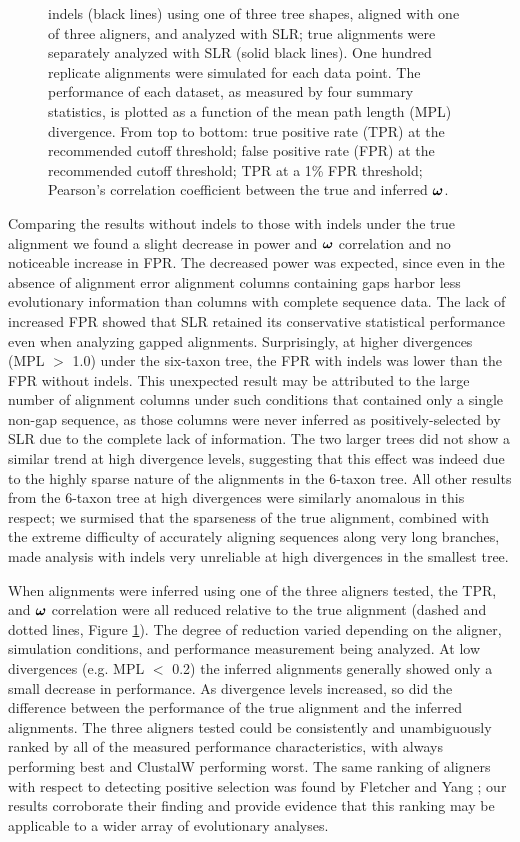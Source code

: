 \documentclass{article}
\begin{document}
\begin{figure}[t]
{  indels (black lines) using one of three tree shapes, aligned with
  one of three aligners, and analyzed with SLR; true alignments were
  separately analyzed with SLR (solid black lines). One hundred
  replicate alignments were simulated for each data point. The
  performance of each dataset, as measured by four summary statistics,
  is plotted as a function of the mean path length (MPL)
  divergence. From top to bottom: true positive rate (TPR) at the
  recommended cutoff threshold; false positive rate (FPR) at the
  recommended cutoff threshold; TPR at a 1\% FPR threshold; Pearson's
  correlation coefficient between the true and inferred $\bm{\omega}$.}
\label{fig_3}
\end{figure}

Comparing the results without indels to those with indels under the
true alignment we found a slight decrease in power and $\bm{\omega}$
correlation and no noticeable increase in FPR. The decreased power was
expected, since even in the absence of alignment error alignment
columns containing gaps harbor less evolutionary information than
columns with complete sequence data. The lack of increased FPR showed
that SLR retained its conservative statistical performance even when
analyzing gapped alignments. Surprisingly, at higher divergences (MPL
$>$ 1.0) under the six-taxon tree, the FPR with indels was lower than
the FPR without indels. This unexpected result may be attributed to
the large number of alignment columns under such conditions that
contained only a single non-gap sequence, as those columns were never
inferred as positively-selected by SLR due to the complete lack of
information. The two larger trees did not show a similar trend at high
divergence levels, suggesting that this effect was indeed due to the
highly sparse nature of the alignments in the 6-taxon tree. All other
results from the 6-taxon tree at high divergences were similarly
anomalous in this respect; we surmised that the sparseness of the true
alignment, combined with the extreme difficulty of accurately aligning
sequences along very long branches, made \sw analysis with indels very
unreliable at high divergences in the smallest tree.

When alignments were inferred using one of the three aligners tested,
the TPR, \tpr{} and $\bm{\omega}$ correlation were all reduced relative to
the true alignment (dashed and dotted lines, Figure \ref{fig_3}). The
degree of reduction varied depending on the aligner, simulation
conditions, and performance measurement being analyzed. At low
divergences (e.g. MPL $<$ 0.2) the inferred alignments generally
showed only a small decrease in performance. As divergence levels
increased, so did the difference between the performance of the true
alignment and the inferred alignments. The three aligners tested could
be consistently and unambiguously ranked by all of the measured
performance characteristics, with \prankc always performing best and
ClustalW performing worst. The same ranking of aligners with respect
to detecting positive selection was found by Fletcher and Yang
\citeyearpar{Fletcher2010Effect}; our results corroborate their
finding and provide evidence that this ranking may be applicable to a
wider array of evolutionary analyses.
\end{document}
